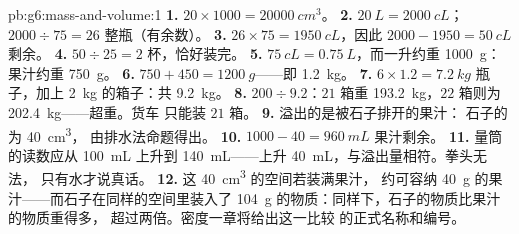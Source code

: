 \begin{solution}{pb:g6:mass-and-volume:1}
\textbf{1.} $20 \times 1000 = \qty{20000}{cm^3}$。
\textbf{2.} $\qty{20}{L} = \qty{2000}{cL}$；$2000 \div 75 = 26$
整瓶（有余数）。
\textbf{3.} $26 \times 75 = \qty{1950}{cL}$，因此 $2000 - 1950 =
\qty{50}{cL}$ 剩余。
\textbf{4.} $50 \div 25 = 2$ 杯，恰好装完。
\textbf{5.} $\qty{75}{cL} = \qty{0.75}{L}$，而一升约重
\qty{1000}{g}：果汁约重 \qty{750}{g}。
\textbf{6.} $750 + 450 = \qty{1200}{g}$——即 \qty{1.2}{kg}。
\textbf{7.} $6 \times 1.2 = \qty{7.2}{kg}$ 瓶子，加上
\qty{2}{kg} 的箱子：共 \qty{9.2}{kg}。
\textbf{8.} $200 \div 9.2$：$21$ 箱重
\qty{193.2}{kg}，$22$ 箱则为 \qty{202.4}{kg}——超重。货车
只能装 $21$ 箱。
\textbf{9.} 溢出的是被石子排开的果汁：
石子的为 \qty{40}{cm^3}，
由排水法命题得出。
\textbf{10.} $1000 - 40 = \qty{960}{mL}$ 果汁剩余。
\textbf{11.} 量筒的读数应从 \qty{100}{mL} 上升到
\qty{140}{mL}——上升 \qty{40}{mL}，与溢出量相符。拳头无法，
只有水才说真话。
\textbf{12.} 这 \qty{40}{cm^3} 的空间若装满果汁，
约可容纳 \qty{40}{g} 的果汁——而石子在同样的空间里装入了 \qty{104}{g}
的物质：同样下，石子的物质比果汁的物质重得多，
超过两倍。密度一章将给出这一比较
的正式名称和编号。
\end{solution}
